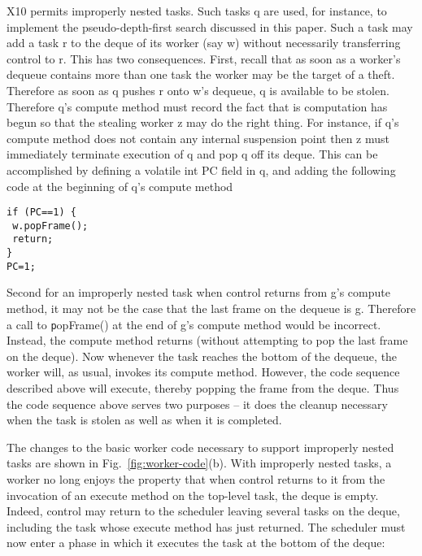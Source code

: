 X10 permits improperly nested tasks. Such tasks q are used, for
instance, to implement the pseudo-depth-first search discussed in this
paper. Such a task may add a task r to the deque of its worker (say w)
without necessarily transferring control to r. This has two
consequences. First, recall that as soon as a worker's dequeue
contains more than one task the worker may be the target of a
theft. Therefore as soon as q pushes r onto w's dequeue, q is
available to be stolen.  Therefore q's compute method must record the
fact that is computation has begun so that the stealing worker z may
do the right thing. For instance, if q's compute method does not
contain any internal suspension point then z must immediately
terminate execution of q and pop q off its deque. This can be
accomplished by defining a volatile int PC field in q, and adding the
following code at the beginning of q's compute method

\begin{verbatim}
if (PC==1) {
 w.popFrame();
 return;
}
PC=1;
\end{verbatim}

Second for an improperly nested task when control returns from g's
compute method, it may not be the case that the last frame on the
dequeue is g. Therefore a call to {\texttt popFrame()} at the end of
g's compute method would be incorrect. Instead, the compute method
returns (without attempting to pop the last frame on the deque). Now
whenever the task reaches the bottom of the dequeue, the worker will,
as usual, invokes its compute method. However, the code sequence
described above will execute, thereby popping the frame from the
deque. Thus the code sequence above serves two purposes -- it does the
cleanup necessary when the task is stolen as well as when it is
completed.

The changes to the basic worker code necessary to support improperly
nested tasks are shown in Fig.~\ref{fig:worker-code}(b). With
improperly nested tasks, a worker no long enjoys the property that
when control returns to it from the invocation of an execute method on
the top-level task, the deque is empty. Indeed, control may return to
the scheduler leaving several tasks on the deque, including the task
whose execute method has just returned. The scheduler must now enter a
phase in which it executes the task at the bottom of the deque:

